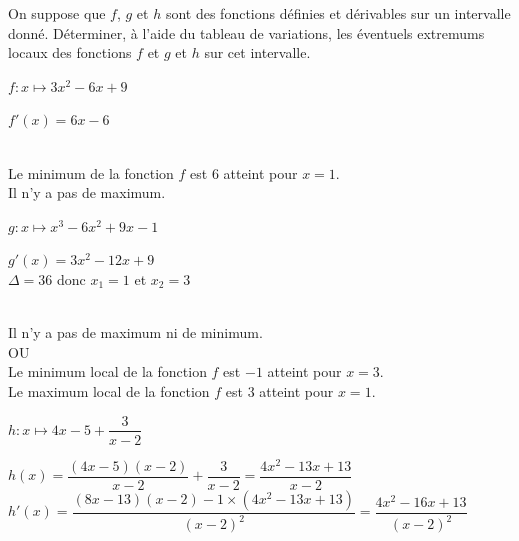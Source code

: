 \documentclass[12pt,a4paper]{article}  %
\begin{document}
On suppose que $f$, $g$ et $h$ sont des fonctions définies et dérivables sur un intervalle donné. Déterminer, à l'aide du tableau de variations, les éventuels extremums locaux des fonctions $f$ et $g$ et $h$ sur cet intervalle.
\begin{enumMet}
    \item $f: x \mapsto 3x^{2}-6 x+9$\\
    \begin{corrBox}
        $f'(x)=6x-6$\\
        \\
    Le minimum de la fonction $f$ est 6 atteint pour $x=1$.\\
    Il n'y a pas de maximum.
    \end{corrBox}
    \item $g: x \mapsto x^{3}-6 x^{2}+9 x-1$\\
    \begin{corrBox}
        $g'(x)=3x^2-12x+9$\\
        $\Delta=36$ donc $x_1=1$ et $x_2=3$\\
        \\
    Il n'y a pas de maximum ni de minimum.\\
    OU\\
    Le minimum local de la fonction $f$ est $-1$ atteint pour $x=3$.\\
    Le maximum local de la fonction $f$ est $3$ atteint pour $x=1$.\\
    \end{corrBox}
    \item {} $h: x \mapsto 4x-5+\dfrac{3}{x-2}$\\
    \begin{corrBox}
        $h(x)=\dfrac{(4x-5)(x-2)}{x-2}+\dfrac{3}{x-2}=\dfrac{4x^2-13x+13}{x-2}$\\
        $h'(x)=\dfrac{(8x-13)(x-2)-1\times(4x^2-13x+13)}{(x-2)^2}=\dfrac{4x^2-16x+13}{(x-2)^2}$\\

\end{corrBox}
\end{enumMet}
\end{document}
